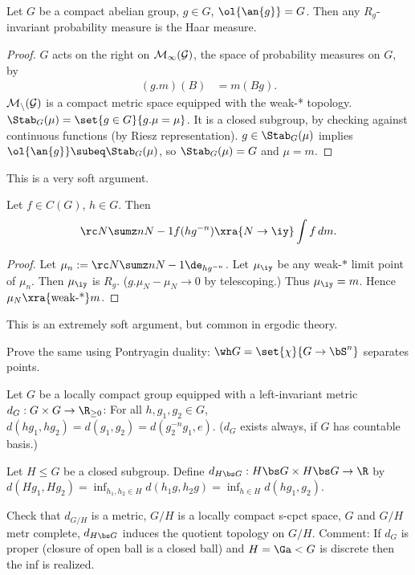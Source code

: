 \begin{pr}
Let $G$ be a compact abelian group, $g\in G$, $\ol{\an{g}}=G$. Then any $R_g$-invariant probability measure is the Haar measure.
\end{pr}
\begin{proof}
$G$ acts on the right on  $\cal M_1(G)$, the space of probability measures on $G$, by 
\begin{align}
(g.m)(B) &= m(Bg).
\end{align}
$\cal M_n(G)$ is a compact metric space equipped with the weak-* topology. 
$\Stab_G(\mu) = \set{g\in G}{g.\mu=\mu}$.
It is a closed subgroup, by checking against continuous functions (by Riesz representation).
$g\in \Stab_G(\mu)$ implies $\ol{\an{g}}\subeq \Stab_G(\mu)$, so $\Stab_G(\mu) = G$ and $\mu=m$.
\end{proof}
This is a very soft argument.
\begin{cor}
Let $f\in C(G)$, $h\in G$. Then
\begin{align}
\rc N \sumz n{N-1} f(hg^{-n}) \xra{N\to \iy} \int f\,dm.
\end{align}
\end{cor}
\begin{proof}
Let $\mu_n:=\rc N\sumz n{N-1}  \de_{hg^{-n}}$. 
Let $\mu_\iy$ be any weak-$*$ limit point of $\mu_n$. Then $\mu_\iy$ is $R_g$. ($g.\mu_N-\mu_N\to 0$ by telescoping.)
 Thus $\mu_\iy=m$. 
Hence $\mu_N \xra{\text{weak-*}} m$.
\end{proof}
This is an extremely soft argument, but common in ergodic theory.
\begin{exr}
Prove the same using Pontryagin duality: $\wh G=\set{\chi}{G\to \bS^n}$ separates points.
\end{exr}
Let $G$ be a locally compact %
group equipped with a left-invariant metric $d_G:G\times G\to \R_{\ge 0}$:
For all $h,g_1,g_2\in G$, $d(hg_1,hg_2)=d(g_1,g_2)=d(g_2^{-n}g_1,e)$. ($d_G$ exists always, if $G$ has countable %
basis.)
\begin{df}
Let $H\le G$ be a closed subgroup. Define $d_{H\bs G}:H\bs G\times H\bs G\to \R$ by $d(Hg_1,Hg_2) = \inf_{h_1,h_2\in H} d(h_1g,h_2g) = \inf_{h\in H} d(hg_1,g_2)$. 
\end{df}
Check that $d_{G/H}$ is  a metric, $G/H$ is a locally compact s-cpct space, $G$ and $G/H$ metr complete, $d_{H\bs G}$ induces the quotient topology on $G/H$.
Comment: If $d_G$ is proper (closure of open ball is a closed ball) and $H=\Ga < G$ is discrete then the inf is realized.

